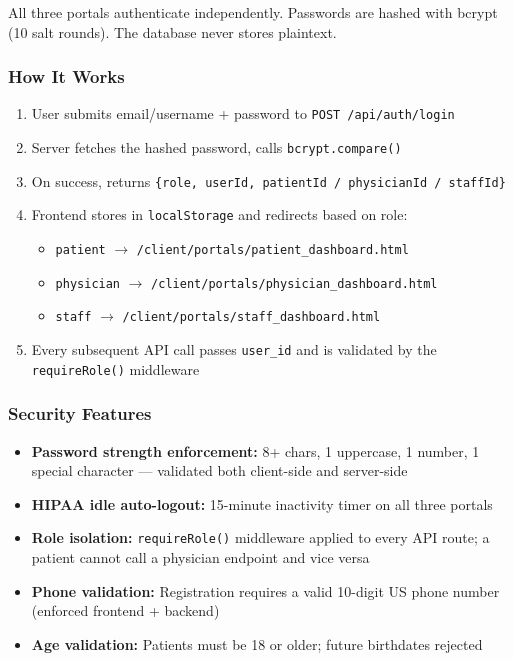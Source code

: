 \documentclass[12pt, letterpaper]{article}
\begin{document}
\begin{infoblue}
All three portals authenticate independently. Passwords are hashed with bcrypt (10 salt rounds). The database never stores plaintext.
\end{infoblue}

\subsubsection{How It Works}
\begin{enumerate}
  \item User submits email/username + password to \texttt{POST /api/auth/login}
  \item Server fetches the hashed password, calls \texttt{bcrypt.compare()}
  \item On success, returns \texttt{\{role, userId, patientId / physicianId / staffId\}}
  \item Frontend stores in \texttt{localStorage} and redirects based on role:
    \begin{itemize}
      \item \texttt{patient} $\rightarrow$ \texttt{/client/portals/patient\_dashboard.html}
      \item \texttt{physician} $\rightarrow$ \texttt{/client/portals/physician\_dashboard.html}
      \item \texttt{staff} $\rightarrow$ \texttt{/client/portals/staff\_dashboard.html}
    \end{itemize}
  \item Every subsequent API call passes \texttt{user\_id} and is validated by the \texttt{requireRole()} middleware
\end{enumerate}

\subsubsection{Security Features}
\begin{itemize}
  \item \textbf{Password strength enforcement:} 8+ chars, 1 uppercase, 1 number, 1 special character — validated both client-side and server-side
  \item \textbf{HIPAA idle auto-logout:} 15-minute inactivity timer on all three portals
  \item \textbf{Role isolation:} \texttt{requireRole()} middleware applied to every API route; a patient cannot call a physician endpoint and vice versa
  \item \textbf{Phone validation:} Registration requires a valid 10-digit US phone number (enforced frontend + backend)
  \item \textbf{Age validation:} Patients must be 18 or older; future birthdates rejected
\end{itemize}
\end{document}

